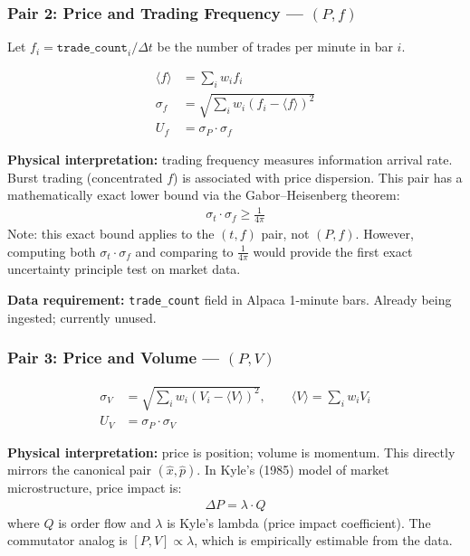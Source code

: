 \documentclass[preprint,12pt]{elsarticle}
\begin{document}
\subsubsection{Pair 2: Price and Trading Frequency --- $(P, f)$}

Let $f_i = \texttt{trade\_count}_i / \Delta t$ be the number of trades per minute in bar $i$.

\begin{align}
    \langle f \rangle &= \sum_i w_i f_i \\
    \sigma_f &= \sqrt{\sum_i w_i (f_i - \langle f \rangle)^2} \\
    U_f &= \sigma_P \cdot \sigma_f
\end{align}

\textbf{Physical interpretation:} trading frequency measures information arrival rate. Burst trading (concentrated $f$) is associated with price dispersion. This pair has a mathematically exact lower bound via the Gabor--Heisenberg theorem:
\begin{align}
    \sigma_t \cdot \sigma_f \geq \frac{1}{4\pi}
\end{align}
Note: this exact bound applies to the $(t, f)$ pair, not $(P, f)$. However, computing both $\sigma_t \cdot \sigma_f$ and comparing to $\frac{1}{4\pi}$ would provide the first exact uncertainty principle test on market data.

\textbf{Data requirement:} \texttt{trade\_count} field in Alpaca 1-minute bars. Already being ingested; currently unused.

\subsubsection{Pair 3: Price and Volume --- $(P, V)$}

\begin{align}
    \sigma_V &= \sqrt{\sum_i w_i (V_i - \langle V \rangle)^2}, \qquad \langle V \rangle = \sum_i w_i V_i \\
    U_V &= \sigma_P \cdot \sigma_V
\end{align}

\textbf{Physical interpretation:} price is position; volume is momentum. This directly mirrors the canonical pair $(\hat{x}, \hat{p})$. In Kyle's (1985) model of market microstructure, price impact is:
\begin{align}
    \Delta P = \lambda \cdot Q
\end{align}
where $Q$ is order flow and $\lambda$ is Kyle's lambda (price impact coefficient). The commutator analog is $[P, V] \propto \lambda$, which is empirically estimable from the data.
\end{document}
